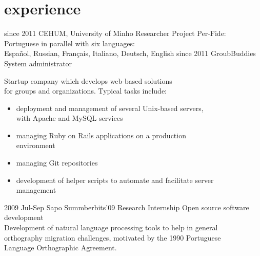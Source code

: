 \documentclass[a4paper]{friggeri-cv}
\begin{document}
\section{experience}
\begin{entrylist}
  \entry
    {{\footnotesize since} 2011}
    {CEHUM, University of Minho}
    {Researcher}
    {Project Per-Fide: Portuguese in parallel with six languages:\\
	Español, Russian, Français, Italiano, Deutsch, English}
  \entry
    {{\footnotesize since} 2011}
    {GroubBuddies}
    {System administrator}
    {
	Startup company which develops web-based solutions\\
	for groups and organizations. Typical tasks include:
		\footnotesize{
		\begin{itemize}
			\item deployment and management of several Unix-based servers,\\ 
			with Apache and MySQL services
			\item managing Ruby on Rails applications on a production\\
			environment
			\item managing Git repositories
			\item development of helper scripts to automate and facilitate server\\
			management
			\end{itemize}
	}}
  \entry
    {2009 {\footnotesize Jul-Sep}}
    {Sapo Summberbits'09}
    {Research Internship}
    {Open source software development\\
	\footnotesize{
	Development of natural language processing tools to help in general\\
	orthography migration challenges, motivated by the 1990 Portuguese\\
	Language Orthographic Agreement.}}
\end{entrylist}
\end{document}
